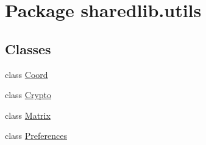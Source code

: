 \hypertarget{namespacesharedlib_1_1utils}{}\section{Package sharedlib.\+utils}
\label{namespacesharedlib_1_1utils}
\subsection*{Classes}
\begin{DoxyCompactItemize}
\item 
class \hyperlink{classsharedlib_1_1utils_1_1_coord}{Coord}
\item 
class \hyperlink{classsharedlib_1_1utils_1_1_crypto}{Crypto}
\item 
class \hyperlink{classsharedlib_1_1utils_1_1_matrix}{Matrix}
\item 
class \hyperlink{classsharedlib_1_1utils_1_1_preferences}{Preferences}
\end{DoxyCompactItemize}
